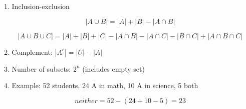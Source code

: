 1. Inclusion-exclusion

$$ |A \cup B| = |A|+|B|-|A \cap B| $$

$$ |A \cup B \cup C| = |A|+|B|+|C|-|A \cap B|-|A \cap C|-|B \cap C|+|A \cap B \cap C| $$

2. Complement: $|A^c| = |U| - |A|$

3. Number of subsets: $2^n$ (includes empty set)

4. Example: 52 students, 24 A in math, 10 A in science, 5 both

$$ neither = 52-(24+10-5) = 23 $$
